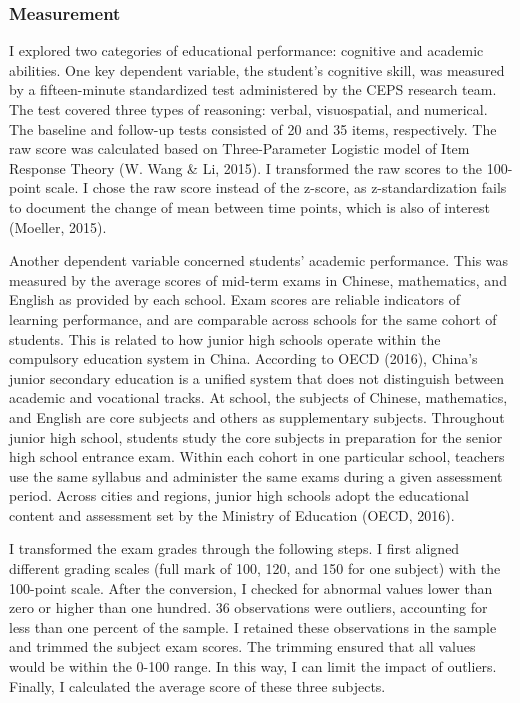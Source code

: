 \documentclass[
  man]{apa7}
\begin{document}
\hypertarget{measurement}{%
\subsubsection{Measurement}\label{measurement}}

I explored two categories of educational performance: cognitive and academic abilities. One key dependent variable, the student's cognitive skill, was measured by a fifteen-minute standardized test administered by the CEPS research team. The test covered three types of reasoning: verbal, visuospatial, and numerical. The baseline and follow-up tests consisted of 20 and 35 items, respectively. The raw score was calculated based on Three-Parameter Logistic model of Item Response Theory (W. Wang \& Li, 2015). I transformed the raw scores to the 100-point scale. I chose the raw score instead of the z-score, as z-standardization fails to document the change of mean between time points, which is also of interest (Moeller, 2015).

Another dependent variable concerned students' academic performance. This was measured by the average scores of mid-term exams in Chinese, mathematics, and English as provided by each school. Exam scores are reliable indicators of learning performance, and are comparable across schools for the same cohort of students. This is related to how junior high schools operate within the compulsory education system in China. According to OECD (2016), China's junior secondary education is a unified system that does not distinguish between academic and vocational tracks. At school, the subjects of Chinese, mathematics, and English are core subjects and others as supplementary subjects. Throughout junior high school, students study the core subjects in preparation for the senior high school entrance exam. Within each cohort in one particular school, teachers use the same syllabus and administer the same exams during a given assessment period. Across cities and regions, junior high schools adopt the educational content and assessment set by the Ministry of Education (OECD, 2016).

I transformed the exam grades through the following steps. I first aligned different grading scales (full mark of 100, 120, and 150 for one subject) with the 100-point scale. After the conversion, I checked for abnormal values lower than zero or higher than one hundred. 36 observations were outliers, accounting for less than one percent of the sample. I retained these observations in the sample and trimmed the subject exam scores. The trimming ensured that all values would be within the 0-100 range. In this way, I can limit the impact of outliers. Finally, I calculated the average score of these three subjects.
\end{document}
